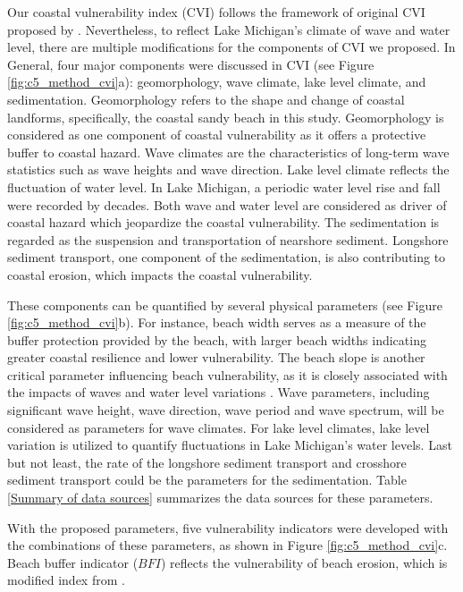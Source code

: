 Our coastal vulnerability index (CVI) follows the framework of original CVI
proposed by \citet{gornitz_global_1991}. Nevertheless, to reflect Lake
Michigan’s climate of wave and water level, there are multiple modifications for
the components of CVI we proposed. In General, four major components were
discussed in CVI (see Figure \ref{fig:c5_method_cvi}a): geomorphology, wave
climate, lake level climate, and sedimentation. Geomorphology refers to the
shape and change of coastal landforms, specifically, the coastal sandy beach in
this study. Geomorphology is considered as one component of coastal
vulnerability as it offers a protective buffer to coastal hazard. Wave climates
are the characteristics of long-term wave statistics such as wave heights and
wave direction. Lake level climate reflects the fluctuation of water level. In
Lake Michigan, a periodic water level rise and fall were recorded by decades.
Both wave and water level are considered as driver of coastal hazard which
jeopardize the coastal vulnerability. The sedimentation is regarded as the
suspension and transportation of nearshore sediment. Longshore sediment
transport, one component of the sedimentation, is also contributing to coastal
erosion, which impacts the coastal vulnerability.

These components can be quantified by several physical parameters (see Figure 
\ref{fig:c5_method_cvi}b). For instance, beach width serves as a measure of the
buffer protection provided by the beach, with larger beach widths indicating
greater coastal resilience and lower vulnerability. The beach slope is another
critical parameter influencing beach vulnerability, as it is closely associated
with the impacts of waves and water level variations \citep{swenson_bluff_2006}.
Wave parameters, including significant wave height, wave direction, wave period
and wave spectrum, will be considered as parameters for wave climates. For lake
level climates, lake level variation is utilized to quantify fluctuations in
Lake Michigan's water levels. Last but not least, the rate of the longshore
sediment transport and crosshore sediment transport could be the parameters for
the sedimentation. Table \ref{Summary of data sources} summarizes the data
sources for these parameters.



With the proposed parameters, five vulnerability indicators were developed with
the combinations of these parameters, as shown in Figure
\ref{fig:c5_method_cvi}c. Beach buffer indicator ($BFI$) reflects the
vulnerability of beach erosion, which is modified index from 
\citet{wiggins_regionally-coherent_2019}.

